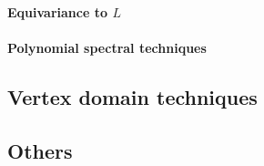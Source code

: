 \paragraph{Equivariance to $L$}

\todo{}

\paragraph{Polynomial spectral techniques}


\subsection{Vertex domain techniques}

\subsection{Others}

